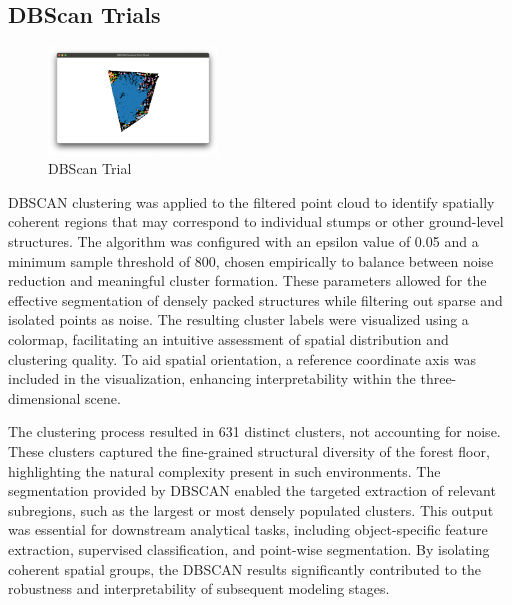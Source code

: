 \documentclass[../report.tex]{subfiles}
\begin{document}
    \subsection{DBScan Trials}
    \begin{figure}[H]
        \centering
        \includegraphics[width=0.4\textwidth]{rnd-project-report-main/figures/Clustering_2_filtered_pointcloud_2.png}
        \caption{DBScan Trial}
    \end{figure}
    DBSCAN clustering was applied to the filtered point cloud to identify spatially coherent regions that may correspond to individual stumps or other ground-level structures. The algorithm was configured with an epsilon value of 0.05 and a minimum sample threshold of 800, chosen empirically to balance between noise reduction and meaningful cluster formation. These parameters allowed for the effective segmentation of densely packed structures while filtering out sparse and isolated points as noise. The resulting cluster labels were visualized using a colormap, facilitating an intuitive assessment of spatial distribution and clustering quality. To aid spatial orientation, a reference coordinate axis was included in the visualization, enhancing interpretability within the three-dimensional scene.

    The clustering process resulted in 631 distinct clusters, not accounting for noise. These clusters captured the fine-grained structural diversity of the forest floor, highlighting the natural complexity present in such environments. The segmentation provided by DBSCAN enabled the targeted extraction of relevant subregions, such as the largest or most densely populated clusters. This output was essential for downstream analytical tasks, including object-specific feature extraction, supervised classification, and point-wise segmentation. By isolating coherent spatial groups, the DBSCAN results significantly contributed to the robustness and interpretability of subsequent modeling stages.
\end{document}
